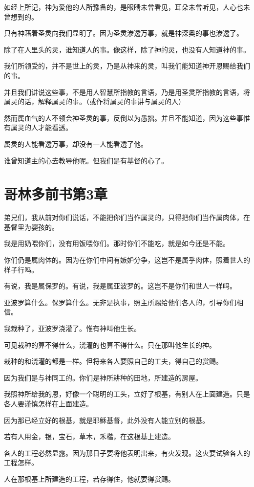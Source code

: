 \documentclass[12pt,oneside]{book}
\begin{document}
如经上所记，神为爱他的人所豫备的，是眼睛未曾看见，耳朵未曾听见，人心也未曾想到的。

只有神藉着圣灵向我们显明了。因为圣灵渗透万事，就是神深奥的事也渗透了。

除了在人里头的灵，谁知道人的事。像这样，除了神的灵，也没有人知道神的事。

我们所领受的，并不是世上的灵，乃是从神来的灵，叫我们能知道神开恩赐给我们的事。

并且我们讲说这些事，不是用人智慧所指教的言语，乃是用圣灵所指教的言语，将属灵的话，解释属灵的事。（或作将属灵的事讲与属灵的人）

然而属血气的人不领会神圣灵的事，反倒以为愚拙。并且不能知道，因为这些事惟有属灵的人才能看透。

属灵的人能看透万事，却没有一人能看透了他。

谁曾知道主的心去教导他呢。但我们是有基督的心了。

\chapter{哥林多前书第3章}
弟兄们，我从前对你们说话，不能把你们当作属灵的，只得把你们当作属肉体，在基督里为婴孩的。

我是用奶喂你们，没有用饭喂你们。那时你们不能吃，就是如今还是不能。

你们仍是属肉体的。因为在你们中间有嫉妒分争，这岂不是属乎肉体，照着世人的样子行吗。

有说，我是属保罗的。有说，我是属亚波罗的。这岂不是你们和世人一样吗。

亚波罗算什么。保罗算什么。无非是执事，照主所赐给他们各人的，引导你们相信。

我栽种了，亚波罗浇灌了。惟有神叫他生长。

可见栽种的算不得什么，浇灌的也算不得什么。只在那叫他生长的神。

栽种的和浇灌的都是一样。但将来各人要照自己的工夫，得自己的赏赐。

因为我们是与神同工的。你们是神所耕种的田地，所建造的房屋。

我照神所给我的恩，好像一个聪明的工头，立好了根基，有别人在上面建造。只是各人要谨慎怎样在上面建造。

因为那已经立好的根基，就是耶稣基督，此外没有人能立别的根基。

若有人用金，银，宝石，草木，禾楷，在这根基上建造。

各人的工程必然显露。因为那日子要将他表明出来，有火发现。这火要试验各人的工程怎样。

人在那根基上所建造的工程，若存得住，他就要得赏赐。
\end{document}
